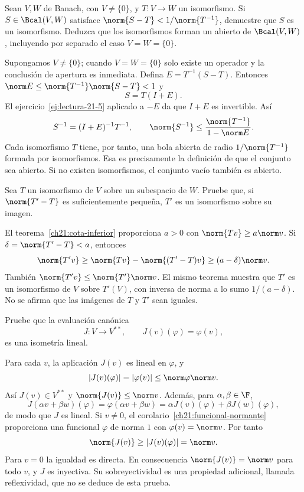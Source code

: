 \begin{ejercicio}\label{ej:lectura-21-6}
Sean $V,W$ de Banach, con $V\ne\{0\}$, y $T:V\to W$ un isomorfismo. Si $S\in\Bcal(V,W)$ satisface $\norm{S-T}<1/\norm{T^{-1}}$, demuestre que $S$ es un isomorfismo. Deduzca que los isomorfismos forman un abierto de $\Bcal(V,W)$, incluyendo por separado el caso $V=W=\{0\}$.
\end{ejercicio}
\begin{solucion}
Supongamos $V\ne\{0\}$; cuando $V=W=\{0\}$ solo existe un operador y la conclusión de apertura es inmediata. Defina $E=T^{-1}(S-T)$. Entonces $\norm E\leq\norm{T^{-1}}\norm{S-T}<1$ y
\[
 S=T(I+E).
\]
El ejercicio~\ref{ej:lectura-21-5} aplicado a $-E$ da que $I+E$ es invertible. Así
\[
 S^{-1}=(I+E)^{-1}T^{-1},\qquad
 \norm{S^{-1}}\leq\frac{\norm{T^{-1}}}{1-\norm E}.
\]
Cada isomorfismo $T$ tiene, por tanto, una bola abierta de radio $1/\norm{T^{-1}}$ formada por isomorfismos. Esa es precisamente la definición de que el conjunto sea abierto. Si no existen isomorfismos, el conjunto vacío también es abierto.
\end{solucion}

\begin{ejercicio}\label{ej:lectura-21-7}
Sea $T$ un isomorfismo de $V$ sobre un subespacio de $W$. Pruebe que, si $\norm{T'-T}$ es suficientemente pequeña, $T'$ es un isomorfismo sobre su imagen.
\end{ejercicio}
\begin{solucion}
El teorema~\ref{ch21:cota-inferior} proporciona $a>0$ con $\norm{Tv}\geq a\norm v$. Si $\delta=\norm{T'-T}<a$, entonces
\[
 \norm{T'v}\geq\norm{Tv}-\norm{(T'-T)v}\geq(a-\delta)\norm v.
\]
También $\norm{T'v}\leq\norm{T'}\norm v$. El mismo teorema muestra que $T'$ es un isomorfismo de $V$ sobre $T'(V)$, con inversa de norma a lo sumo $1/(a-\delta)$. No se afirma que las imágenes de $T$ y $T'$ sean iguales.
\end{solucion}

\begin{ejercicio}\label{ej:lectura-21-8}
Pruebe que la evaluación canónica
\[
 J:V\longrightarrow V^{**},\qquad J(v)(\varphi)=\varphi(v),
\]
es una isometría lineal.
\end{ejercicio}
\begin{solucion}
Para cada $v$, la aplicación $J(v)$ es lineal en $\varphi$, y
\[
 |J(v)(\varphi)|=|\varphi(v)|\leq\norm\varphi\norm v.
\]
Así $J(v)\in V^{**}$ y $\norm{J(v)}\leq\norm v$. Además, para $\alpha,\beta\in\F$,
\[
 J(\alpha v+\beta w)(\varphi)
 =\varphi(\alpha v+\beta w)
 =\alpha J(v)(\varphi)+\beta J(w)(\varphi),
\]
de modo que $J$ es lineal. Si $v\ne0$, el corolario~\ref{ch21:funcional-normante} proporciona una funcional $\varphi$ de norma $1$ con $\varphi(v)=\norm v$. Por tanto
\[
 \norm{J(v)}\geq|J(v)(\varphi)|=\norm v.
\]
Para $v=0$ la igualdad es directa. En consecuencia $\norm{J(v)}=\norm v$ para todo $v$, y $J$ es inyectiva. Su sobreyectividad es una propiedad adicional, llamada reflexividad, que no se deduce de esta prueba.
\end{solucion}

